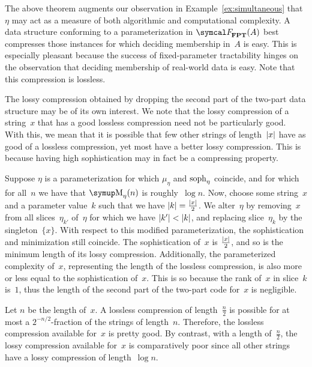 The above theorem augments our observation in Example~\ref{ex:simultaneous} that $\eta$ may act as a measure of both algorithmic and computational complexity.
A data structure conforming to a parameterization in $\calF_\cl{FPT}(A)$ best compresses those instances for which deciding membership in~$A$ is easy.
This is especially pleasant because the success of fixed-parameter tractability hinges on the observation that deciding membership of real-world data is easy.
Note that this compression is lossless.

The lossy compression obtained by dropping the second part of the two-part data structure may be of its own interest.
We note that the lossy compression of a string~$x$ that has a good lossless compression need not be particularly good.
With this, we mean that it is possible that few other strings of length~${\lvert x\rvert}$ have as good of a lossless compression, yet most have a better lossy compression.
This is because having high sophistication may in fact be a compressing property.

\begin{example}
  Suppose $\eta$ is a parameterization for which $\mu_\eta$ and $\operatorname{soph}_\eta$ coincide, and for which for all~$n$ we have that $\upM_\eta(n)$ is roughly~$\log n$.
  Now, choose some string~$x$ and a parameter value~$k$ such that we have ${\lvert k\rvert} = \frac{{\lvert x\rvert}}{2}$.
  We alter~$\eta$ by removing~$x$ from all slices~$\eta_{k'}$ of~$\eta$ for which we have ${\lvert k'\rvert} < {\lvert k\rvert}$, and replacing slice~$\eta_k$ by the singleton~$\{x\}$.
  With respect to this modified parameterization, the sophistication and minimization still coincide.
  The sophistication of~$x$ is $\frac{{\lvert x\rvert}}{2}$, and so is the minimum length of its lossy compression.
  Additionally, the parameterized complexity of~$x$, representing the length of the lossless compression, is also more or less equal to the sophistication of~$x$.
  This is so because the rank of~$x$ in slice~$k$ is~$1$, thus the length of the second part of the two-part code for~$x$ is negligible.

  Let $n$ be the length of~$x$.
  A lossless compression of length~$\frac{n}{2}$ is possible for at most a $2^{-n/2}$-fraction of the strings of length~$n$.
  Therefore, the lossless compression available for~$x$ is pretty good.
  By contrast, with a length of~$\frac{n}{2}$, the lossy compression available for~$x$ is comparatively poor since all other strings have a lossy compression of length~$\log n$.
\end{example}


